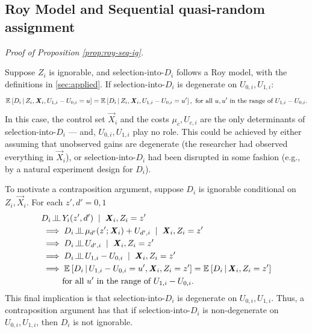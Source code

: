 \subsection{Roy Model and Sequential quasi-random assignment}
\label{appendix:roy-seq-ig}
\textit{Proof of Proposition \ref{prop:roy-seq-ig}.}

Suppose $Z_i$ is ignorable, and selection-into-$D_i$ follows a Roy model, with the definitions in \autoref{sec:applied}.
If selection-into-$D_i$ is degenerate on $U_{0,i}, U_{1,i}$:
\[ \mathbb{E}_{} \left[ D_i \, \middle\vert \, Z_i, \boldsymbol{\mathit{X}}_i, U_{1,i}- U_{0,i} = u \right]
    = \mathbb{E}_{} \left[ D_i \, \middle\vert \, Z_i, \boldsymbol{\mathit{X}}_i, U_{1,i}- U_{0,i} = u' \right],
    \text{ for all } u, u' \text{ in the range of $U_{1,i}- U_{0,i}$.} \]
In this case, the control set $\vec X_i$ and the costs $\mu_c, U_{c,i}$ are the only determinants of selection-into-$D_i$ --- and, $U_{0,i}, U_{1,i}$ play no role.
This could be achieved by either assuming that unobserved gains are degenerate (the researcher had observed everything in $\vec X_i$), or selection-into-$D_i$ had been disrupted in some fashion (e.g., by a natural experiment design for $D_i$).

To motivate a contraposition argument, suppose $D_i$ is ignorable conditional on $Z_i, \vec X_i$.
For each $z', d' = 0, 1$
\begin{align*}
    & D_i \indep Y_i(z', d') \;\; | \;\; \vec X_i, Z_i = z' \\
    &\implies D_i \indep \mu_{d'}(z'; \vec X_i) + U_{d',i} \;\; | \;\; \vec X_i, Z_i = z' \\
    &\implies D_i \indep U_{d',i} \;\; | \;\; \vec X_i, Z_i = z' \\
    &\implies D_i \indep U_{1,i} - U_{0,i} \;\; | \;\; \vec X_i, Z_i = z' \\
    &\implies \Egiven{D_i}{U_{1,i} - U_{0,i} = u', \vec X_i, Z_i = z'}
    = \Egiven{D_i}{\vec X_i, Z_i = z'} \\
    & \;\;\; \;\;\; \;\;\; \text{for all } u' \text{ in the range of $U_{1,i}- U_{0,i}$.}
\end{align*}
This final implication is that selection-into-$D_i$ is degenerate on $U_{0,i}, U_{1,i}$.
Thus, a contraposition argument has that if selection-into-$D_i$ is non-degenerate on $U_{0,i}, U_{1,i}$, then $D_i$ is not ignorable.

